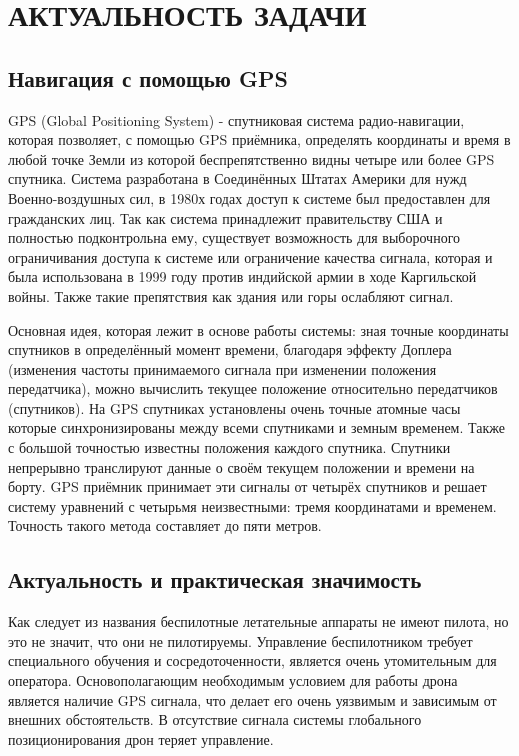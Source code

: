 \chapter{АКТУАЛЬНОСТЬ ЗАДАЧИ}

\section{Навигация с помощью GPS}
GPS (Global Positioning System) - спутниковая система радио-навигации, которая позволяет, с помощью GPS приёмника, определять координаты и время в любой точке Земли из которой беспрепятственно видны четыре или более GPS спутника. Система разработана в Соединённых Штатах Америки для нужд  Военно-воздушных сил, в 1980х годах доступ к системе был предоставлен для гражданских лиц. Так как система принадлежит правительству США и полностью подконтрольна ему, существует возможность для выборочного ограничивания доступа к системе или ограничение качества сигнала, которая и была использована в 1999 году против индийской армии в ходе Каргильской войны. Также такие препятствия как здания или горы ослабляют сигнал.

Основная идея, которая лежит в основе работы системы: зная точные координаты спутников в определённый момент времени, благодаря эффекту Доплера (изменения частоты принимаемого сигнала при изменении положения передатчика), можно вычислить текущее положение относительно передатчиков (спутников). На GPS спутниках установлены очень точные атомные часы которые синхронизированы между всеми спутниками и земным временем. Также с большой точностью известны положения каждого спутника. Спутники непрерывно транслируют данные о своём текущем положении и времени на борту. GPS приёмник принимает эти сигналы от четырёх спутников и решает систему уравнений с четырьмя неизвестными: тремя координатами и временем. Точность такого метода составляет до пяти метров.

\section{Актуальность и практическая значимость}

Как следует из названия беспилотные летательные аппараты не имеют пилота, но это не значит, что они не пилотируемы. Управление беспилотником требует специального обучения и сосредоточенности, является очень утомительным для оператора. Основополагающим необходимым условием для работы дрона является наличие GPS сигнала, что делает его очень уязвимым и зависимым от внешних обстоятельств. В отсутствие сигнала системы глобального позиционирования дрон теряет управление.

